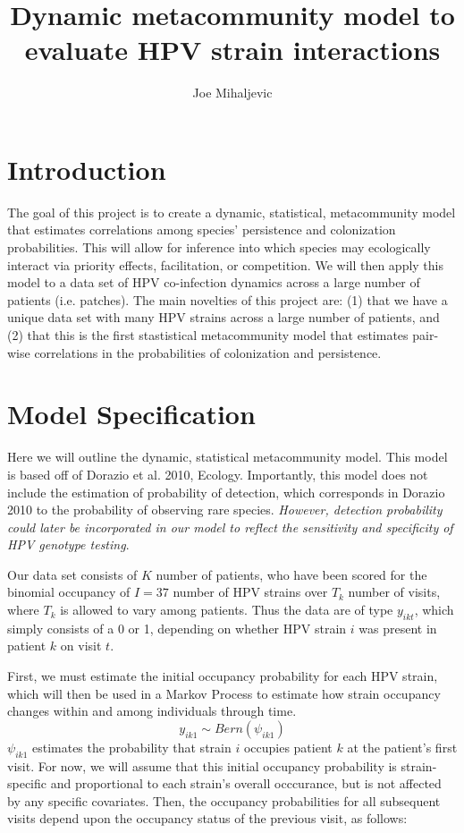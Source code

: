 \documentclass{article}
\title{Dynamic metacommunity model to evaluate HPV strain interactions}
\author{Joe Mihaljevic}
\begin{document}

\maketitle

\section*{Introduction}

The goal of this project is to create a dynamic, statistical, metacommunity model that estimates correlations among species' persistence and colonization probabilities. This will allow for inference into which species may ecologically interact via priority effects, facilitation, or competition. We will then apply this model to a data set of HPV co-infection dynamics across a large number of patients (i.e. patches). The main novelties of this project are: (1) that we have a unique data set with many HPV strains across a large number of patients, and (2) that this is the first stastistical metacommunity model that estimates pair-wise correlations in the probabilities of colonization and persistence.

\section*{Model Specification}

Here we will outline the dynamic, statistical metacommunity model. This model is based off of Dorazio et al. 2010, Ecology. Importantly, this model does not include the estimation of probability of detection, which corresponds in Dorazio 2010 to the probability of observing rare species. \emph{However, detection probability could later be incorporated in our model to reflect the sensitivity and specificity of HPV genotype testing}.

Our data set consists of $K$ number of patients, who have been scored for the binomial occupancy of $I = 37$ number of HPV strains over $T_{k}$ number of visits, where $T_{k}$ is allowed to vary among patients. Thus the data are of type $y_{ikt}$, which simply consists of a 0 or 1, depending on whether HPV strain $i$ was present in patient $k$ on visit $t$. 

First, we must estimate the initial occupancy probability for each HPV strain, which will then be used in a Markov Process to estimate how strain occupancy changes within and among individuals through time. 
$$y_{ik1} \sim Bern(\psi_{ik1})$$
$\psi_{ik1}$ estimates the probability that strain $i$ occupies patient $k$ at the patient's first visit. For now, we will assume that this initial occupancy probability is strain-specific and proportional to each strain's overall occcurance, but is not affected by any specific covariates. Then, the occupancy probabilities for all subsequent visits depend upon the occupancy status of the previous visit, as follows:
\end{document}
